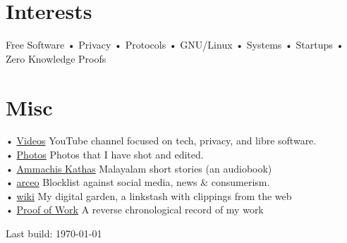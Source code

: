 \documentclass[a4,12pt]{article}
\begin{document}
\section{Interests}
Free Software
• Privacy
• Protocols
• GNU/Linux
• Systems
• Startups
• Zero Knowledge Proofs

\section{Misc}
• \href{https://polarhive.net/videos}{Videos} YouTube channel focused on tech, privacy, and libre software.\\
• \href{https://polarhive.net/photos}{Photos} Photos that I have shot and edited. \\
• \href{https://polarhive.net/ammachiskathas}{Ammachis Kathas} Malayalam short stories (an audiobook) \\
• \href{https://polarhive.net/arceo}{arceo} Blocklist against social media, news \& consumerism. \\
• \href{https://polarhive.net/wiki}{wiki} My digital garden, a linkstash with clippings from the web \\
• \href{https://polarhive.net/pow}{Proof of Work} A reverse chronological record of my work 

\href{https://github.com/polarhive/resume}{} Last build: \today
\end{document}

